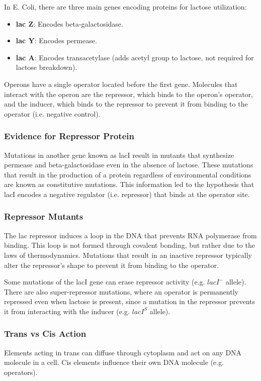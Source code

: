 \documentclass[12pt,titlepage]{article}
\begin{document}
        In E. Coli, there are three main genes encoding proteins for lactose utilization:
        \begin{itemize}
          \item \textbf{lac Z}: Encodes beta-galactosidase.
          \item \textbf{lac Y}: Encodes permease.
          \item \textbf{lac A}: Encodes transacetylase (adds acetyl group to lactose, not required for lactose breakdown).
        \end{itemize}

        Operons have a single operator located before the first gene. Molecules that interact with the operon are the repressor, which binds to the operon's operator,
        and the inducer, which binds to the repressor to prevent it from binding to the operator (i.e. negative control).

      \subsubsection{Evidence for Repressor Protein}
        Mutations in another gene known as lacI result in mutants that synthesize permease and beta-galactosidase even in the absence of lactose. These mutations
        that result in the production of a protein regardless of environmental conditions are known as constitutive mutations. This information led to the
        hypothesis that lacI encodes a negative regulator (i.e. repressor) that binds at the operator site.

      \subsubsection{Repressor Mutants}
        The lac repressor induces a loop in the DNA that prevents RNA polymerase from binding. This loop is not formed through covalent bonding, but rather due to
        the laws of thermodynamics. Mutations that result in an inactive repressor typically alter the repressor's shape to prevent it from binding to the operator.

        Some mutations of the lacI gene can erase repressor activity (e.g. $lacI^-$ allele). There are also super-repressor mutations, where an operator is
        permanently repressed even when lactose is present, since a mutation in the repressor prevents it from interacting with the inducer (e.g. $lacI^S$ allele).

      \subsubsection{Trans vs Cis Action}
        Elements acting in trans can diffuse through cytoplasm and act on any DNA molecule in a cell. Cis elements influence their own DNA molecule (e.g. operators).
\end{document}

